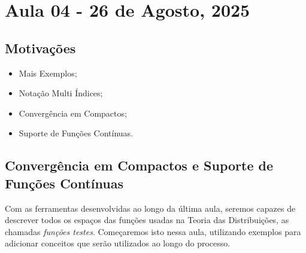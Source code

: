 \documentclass[../distribution_theory_notes.tex]{subfiles}
\begin{document}
\section{Aula 04 - 26 de Agosto, 2025}
\subsection{Motivações}
\begin{itemize}
 \item Mais Exemplos;
 \item Notação Multi Índices;
 \item Convergência em Compactos;
 \item Suporte de Funções Contínuas.
\end{itemize}
\subsection{Convergência em Compactos e Suporte de Funções Contínuas}
  Com as ferramentas desenvolvidas ao longo da última aula, seremos capazes de descrever todos os espaços das funções usadas na Teoria das Distribuições, as chamadas \textit{funções testes}. Começaremos isto nessa aula, utilizando exemplos para adicionar conceitos que serão utilizados ao longo do processo. 
\end{document}
